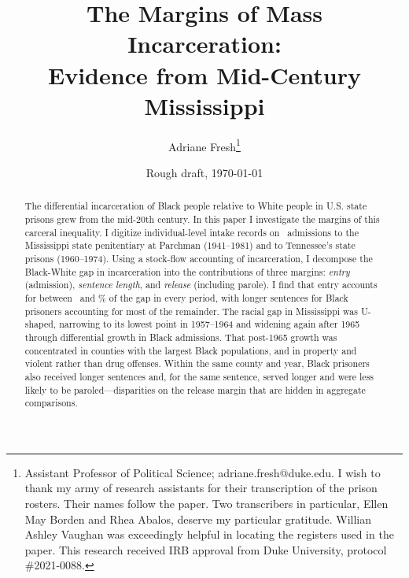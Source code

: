 \documentclass[12pt]{article}
\begin{document}
\onehalfspacing
\setlength{\parindent}{0.3in}
\setlength{\parskip}{.0in}


\title{The Margins of Mass Incarceration: \\ Evidence from Mid-Century Mississippi}
\author{Adriane Fresh\footnote{\footnotesize Assistant Professor of Political Science; adriane.fresh$@$duke.edu. I wish to thank my army of research assistants for their transcription of the prison rosters.  Their names follow the paper.  Two transcribers in particular, Ellen May Borden and Rhea Abalos, deserve my particular gratitude.  Willian Ashley Vaughan was exceedingly helpful in locating the registers used in the paper.  This research received IRB approval from Duke University, protocol \#2021-0088.}}

  \normalsize

\date{\large Rough draft, \today }


\maketitle
\vspace{.1in}






\begin{abstract}
\bigskip
\noindent The differential incarceration of Black people relative to White people in U.S. state prisons grew from the mid-20th century.  In this paper I investigate the margins of this carceral inequality.  I digitize individual-level intake records on \unskip~admissions to the Mississippi state penitentiary at Parchman (1941--1981) and to Tennessee's state prisons (1960--1974).  Using a stock-flow accounting of incarceration, I decompose the Black-White gap in incarceration into the contributions of three margins: \emph{entry} (admission), \emph{sentence length}, and \emph{release} (including parole).  I find that entry accounts for between \unskip~and \unskip\% of the gap in every period, with longer sentences for Black prisoners accounting for most of the remainder.  The racial gap in Mississippi was U-shaped, narrowing to its lowest point in 1957--1964 and widening again after 1965 through differential growth in Black admissions.  That post-1965 growth was concentrated in counties with the largest Black populations, and in property and violent rather than drug offenses.  Within the same county and year, Black prisoners also received longer sentences and, for the same sentence, served longer and were less likely to be paroled---disparities on the release margin that are hidden in aggregate comparisons.
\end{abstract}
\end{document}
